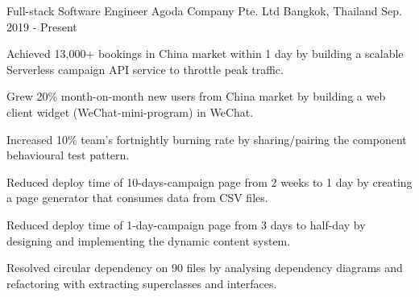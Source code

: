 

\begin{cventries}

  \cventry
  {Full-stack Software Engineer} %
  {Agoda Company Pte. Ltd} %
  {Bangkok, Thailand} %
  {Sep. 2019 - Present} %
  {
    \begin{cvitems} %
      \item {Achieved 13,000+ bookings in China market within 1 day by building a scalable Serverless campaign API service to throttle peak traffic.}
      \item {Grew 20\% month-on-month new users from China market by building a web client widget (WeChat-mini-program) in WeChat.}
      \item {Increased 10\% team's fortnightly burning rate by sharing/pairing the component behavioural test pattern.}
      \item {Reduced deploy time of 10-days-campaign page from 2 weeks to 1 day by creating a page generator that consumes data from CSV files.}
      \item {Reduced deploy time of 1-day-campaign page from 3 days to half-day by designing and implementing the dynamic content system.}
      \item {Resolved circular dependency on 90 files by analysing dependency diagrams and refactoring with extracting superclasses and interfaces.}
    \end{cvitems}
  }


\end{cventries}
